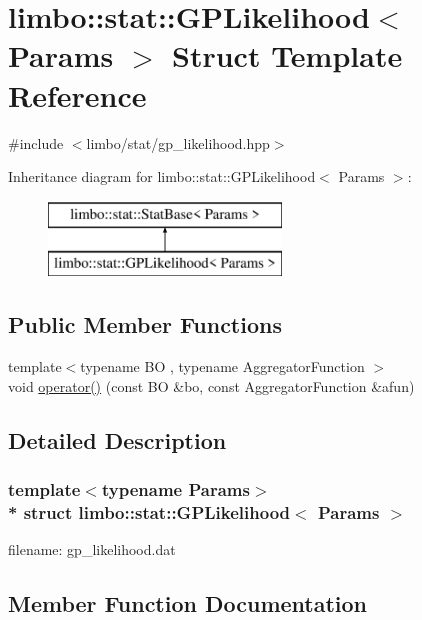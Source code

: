 \hypertarget{structlimbo_1_1stat_1_1_g_p_likelihood}{}\section{limbo\+:\+:stat\+:\+:G\+P\+Likelihood$<$ Params $>$ Struct Template Reference}
\label{structlimbo_1_1stat_1_1_g_p_likelihood}


{\ttfamily \#include $<$limbo/stat/gp\+\_\+likelihood.\+hpp$>$}

Inheritance diagram for limbo\+:\+:stat\+:\+:G\+P\+Likelihood$<$ Params $>$\+:\begin{figure}[H]
\begin{center}
\leavevmode
\includegraphics[height=2.000000cm]{structlimbo_1_1stat_1_1_g_p_likelihood}
\end{center}
\end{figure}
\subsection*{Public Member Functions}
\begin{DoxyCompactItemize}
\item 
{\footnotesize template$<$typename BO , typename Aggregator\+Function $>$ }\\void \hyperlink{structlimbo_1_1stat_1_1_g_p_likelihood_ac5590ba5e63354d6318d78712c8f6074}{operator()} (const BO \&bo, const Aggregator\+Function \&afun)
\end{DoxyCompactItemize}


\subsection{Detailed Description}
\subsubsection*{template$<$typename Params$>$\\*
struct limbo\+::stat\+::\+G\+P\+Likelihood$<$ Params $>$}

filename\+: {\ttfamily gp\+\_\+likelihood.\+dat} 

\subsection{Member Function Documentation}
